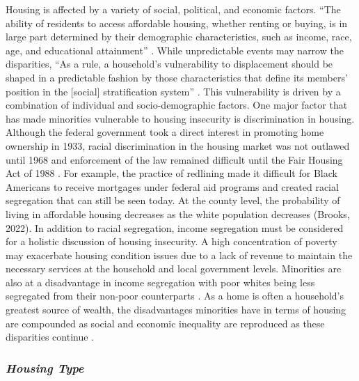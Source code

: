 Housing is affected by a variety of social, political, and economic factors. “The ability of residents to access affordable housing, whether renting or buying, is in large part determined by their demographic characteristics, such as income, race, age, and educational attainment” \citep[115]{yadavalli_comprehensive_2020}. While unpredictable events may narrow the disparities, “As a rule, a household’s vulnerability to displacement should be shaped in a predictable fashion by those characteristics that define its members’ position in the [social] stratification system” \citep[5]{lee_forced_2020}. This vulnerability is driven by a combination of individual and socio-demographic factors. One major factor that has made minorities vulnerable to housing insecurity is discrimination in housing. Although the federal government took a direct interest in promoting home ownership in 1933, racial discrimination in the housing market was not outlawed until 1968 and enforcement of the law remained difficult until the Fair Housing Act of 1988 \citep{sharp_emerging_2014}. For example, the practice of redlining made it difficult for Black Americans to receive mortgages under federal aid programs and created racial segregation that can still be seen today. At the county level, the probability of living in affordable housing decreases as the white population decreases (Brooks, 2022). In addition to racial segregation, income segregation must be considered for a holistic discussion of housing insecurity. A high concentration of poverty may exacerbate housing condition issues due to a lack of revenue to maintain the necessary services at the household and local government levels. Minorities are also at a disadvantage in income segregation with poor whites being less segregated from their non-poor counterparts \citep{lichter_ruralurban_2021}. As a home is often a household's greatest source of wealth, the disadvantages minorities have in terms of housing are compounded as social and economic inequality are reproduced as these disparities continue \citep{krivo_housing_2004}.  

\subsubsection{\textit{Housing Type}} 

